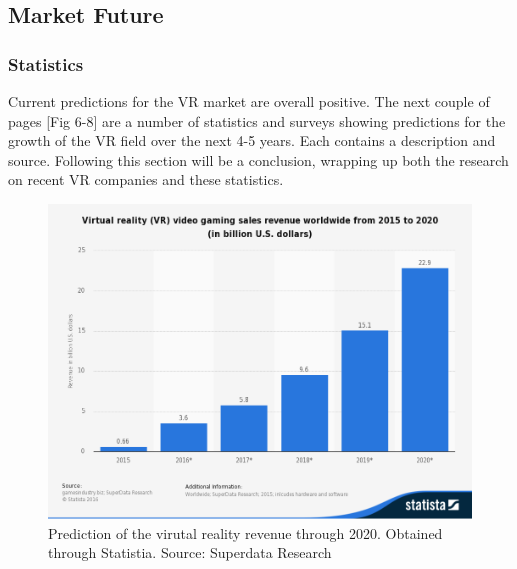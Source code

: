 \documentclass[a4paper,10pt]{article}
\begin{document}
\subsection{Market Future}
\subsubsection{Statistics}

Current predictions for the VR market are overall positive.  The next couple of pages [Fig 6-8] are a number of statistics and surveys showing predictions for the growth of the VR field over the next 4-5 years.  Each contains a description and source.  Following this section will be a conclusion, wrapping up both the research on recent VR companies and these statistics.

\begin{figure}[H]
	\centerline{\includegraphics[scale = 0.3]{statMon2.png}}
	\caption{Prediction of the virutal reality revenue through 2020.  Obtained through Statistia.  Source: Superdata Research}
	\label{fig:virRevenue}
\end{figure}
\end{document}
